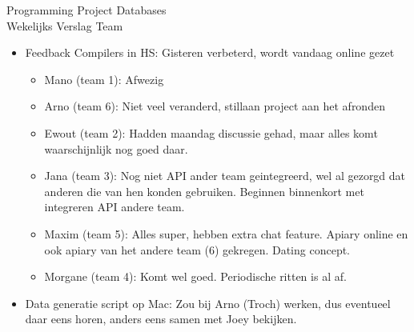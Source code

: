 \documentclass{article}
\newcounter{team}
\begin{document}

    \begin{Minutes}{Programming Project Databases \\ Wekelijks Verslag Team }
        \missingNoExcuse{/}
        \missingExcused{/}

        \maketitle

        \begin{itemize}
            \item Feedback Compilers in HS: Gisteren verbeterd, wordt vandaag online gezet
            \begin{itemize}
                \item Mano (team 1): Afwezig
                \item Arno (team 6): Niet veel veranderd, stillaan project aan het afronden
                \item Ewout (team 2): Hadden maandag discussie gehad, maar alles komt waarschijnlijk nog goed daar.
                \item Jana (team 3): Nog niet API ander team geintegreerd, wel al gezorgd dat anderen die van hen konden gebruiken. Beginnen binnenkort met integreren API andere team.
                \item Maxim (team 5): Alles super, hebben extra chat feature. Apiary online en ook apiary van het andere team (6) gekregen. Dating concept.
                \item Morgane (team 4): Komt wel goed. Periodische ritten is al af.
            \end{itemize}
            \item Data generatie script op Mac: Zou bij Arno (Troch) werken, dus eventueel daar eens horen, anders eens samen met Joey bekijken.
        \end{itemize}





\end{Minutes}
\end{document}
